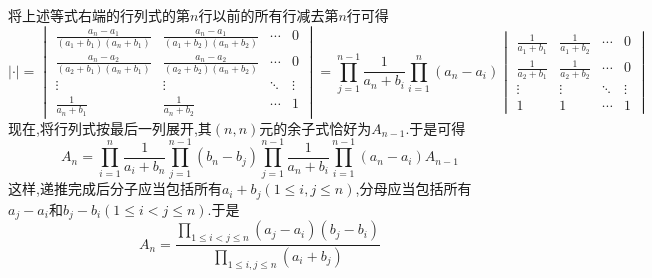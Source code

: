\documentclass{ctexart}
\begin{document}
\begin{solution}
    将上述等式右端的行列式的第$n$行以前的所有行减去第$n$行可得
    \[|\cdot|=\begin{vmatrix}
        \frac{a_n-a_1}{\left(a_1+b_1\right)\left(a_n+b_1\right)}&\frac{a_n-a_1}{\left(a_1+b_2\right)\left(a_n+b_2\right)}&\cdots&0\\
        \frac{a_n-a_2}{\left(a_2+b_1\right)\left(a_n+b_1\right)}&\frac{a_n-a_2}{\left(a_2+b_2\right)\left(a_n+b_2\right)}&\cdots&0\\
        \vdots&\vdots&\ddots&\vdots\\
        \frac{1}{a_n+b_1}&\frac{1}{a_n+b_2}&\cdots&1
    \end{vmatrix}=\prod_{j=1}^{n-1}\dfrac{1}{a_n+b_i}\prod_{i=1}^{n}\left(a_n-a_i\right)\begin{vmatrix}
        \frac{1}{a_1+b_1}&\frac{1}{a_1+b_2}&\cdots&0\\
        \frac{1}{a_2+b_1}&\frac{1}{a_2+b_2}&\cdots&0\\
        \vdots&\vdots&\ddots&\vdots\\
        1&1&\cdots&1
    \end{vmatrix}\]
    现在,将行列式按最后一列展开,其$(n,n)$元的余子式恰好为$A_{n-1}$.于是可得
    \[A_n=\prod_{i=1}^{n}\dfrac{1}{a_i+b_n}\prod_{j=1}^{n-1}\left(b_n-b_j\right)\prod_{j=1}^{n-1}\dfrac{1}{a_n+b_i}\prod_{i=1}^{n-1}\left(a_n-a_i\right)A_{n-1}\]
    这样,递推完成后分子应当包括所有$a_i+b_j(1\leq i,j\leq n)$,分母应当包括所有$a_j-a_i$和$b_j-b_i(1\leq i<j\leq n)$.于是
    \[A_n=\dfrac{\displaystyle\prod_{1\leqslant i<j\leqslant n}\left(a_j-a_i\right)\left(b_j-b_i\right)}{\displaystyle\prod_{1\leqslant i,j\leqslant n}\left(a_i+b_j\right)}\]
\end{solution}
\end{document}
